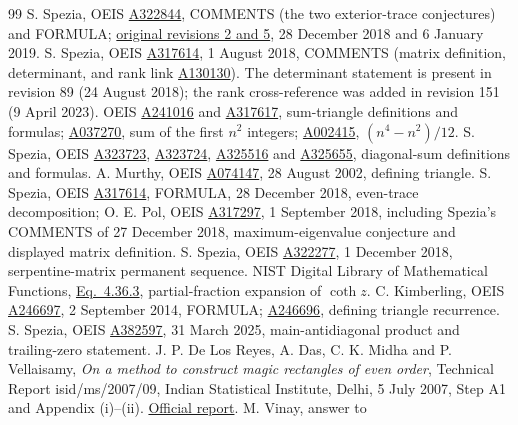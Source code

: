 \documentclass[11pt]{article}
\begin{document}
\begin{thebibliography}{99}
 S. Spezia, OEIS \href{https://oeis.org/A322844}{A322844},
COMMENTS (the two exterior-trace conjectures) and FORMULA;
\href{https://oeis.org/history?seq=A322844\&start=60}{original revisions 2 and 5},
28 December 2018 and 6 January 2019.
 S. Spezia, OEIS \href{https://oeis.org/A317614}{A317614},
1 August 2018, COMMENTS (matrix definition, determinant, and rank link
\href{https://oeis.org/A130130}{A130130}).
The determinant statement is present in revision 89 (24 August 2018);
the rank cross-reference was added in revision 151 (9 April 2023).
 OEIS \href{https://oeis.org/A241016}{A241016} and
\href{https://oeis.org/A317617}{A317617}, sum-triangle definitions and formulas;
\href{https://oeis.org/A037270}{A037270}, sum of the first $n^2$ integers;
\href{https://oeis.org/A002415}{A002415}, $(n^4-n^2)/12$.
 S. Spezia, OEIS
\href{https://oeis.org/A323723}{A323723},
\href{https://oeis.org/A323724}{A323724},
\href{https://oeis.org/A325516}{A325516} and
\href{https://oeis.org/A325655}{A325655}, diagonal-sum definitions and formulas.
 A. Murthy, OEIS
\href{https://oeis.org/A074147}{A074147}, 28 August 2002, defining triangle.
 S. Spezia, OEIS \href{https://oeis.org/A317614}{A317614},
FORMULA, 28 December 2018, even-trace decomposition; O. E. Pol,
OEIS \href{https://oeis.org/A317297}{A317297}, 1 September 2018,
including Spezia's COMMENTS of 27 December 2018,
maximum-eigenvalue conjecture and displayed matrix definition.
 S. Spezia, OEIS
\href{https://oeis.org/A322277}{A322277}, 1 December 2018,
serpentine-matrix permanent sequence.
 NIST Digital Library of Mathematical Functions,
\href{https://dlmf.nist.gov/4.36.E3}{Eq.~4.36.3}, partial-fraction expansion
of $\coth z$.
 C. Kimberling, OEIS
\href{https://oeis.org/A246697}{A246697}, 2 September 2014,
FORMULA; \href{https://oeis.org/A246696}{A246696}, defining triangle recurrence.
 S. Spezia, OEIS
\href{https://oeis.org/A382597}{A382597}, 31 March 2025,
main-antidiagonal product and trailing-zero statement.
 J. P. De Los Reyes, A. Das, C. K. Midha and
P. Vellaisamy, \emph{On a method to construct magic rectangles of even order},
Technical Report isid/ms/2007/09, Indian Statistical Institute, Delhi,
5 July 2007, Step A1 and Appendix (i)--(ii).
\href{http://www.isid.ac.in/\string~statmath/eprints/2007/isid200709.pdf}{Official report}.
 M. Vinay, answer to

\end{thebibliography}
\end{document}
